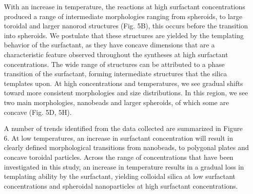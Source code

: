\documentclass[a4paper,12pt,twocolumn]{article}
\begin{document}
  	\begin{figure}[h!]
  	\noindent%
	\begin{minipage}{\linewidth}%
	\end{minipage}
	\end{figure}	
  	
  	
  	With an increase in temperature, the reactions at high surfactant concentrations produced a range of intermediate morphologies ranging from spheroids, to large toroidal and larger nanorod structures (Fig. 5B), this occurs before the transition into spheroids. We postulate that these structures are yielded by the templating behavior of the surfactant, as they have concave dimensions that are a characteristic feature observed throughout the syntheses at high surfactant concentrations. The wide range of structures can be attributed to a phase transition of the surfactant, forming intermediate structures that the silica templates upon. At high concentrations and temperatures, we see gradual shifts toward more consistent morphologies and size distributions. In this region, we see two main morphologies, nanobeads and larger spheroids, of which some are concave (Fig. 5D, 5H).
  	
  	A number of trends identified from the data collected are summarized in Figure 6. At low temperatures, an increase in surfactant concentration will result in clearly defined morphological transitions from nanobeads, to polygonal plates and concave toroidal particles. Across the range of concentrations that have been investigated in this study, an increase in temperature results in a gradual loss in templating ability by the surfactant, yielding colloidal silica at low surfactant concentrations and spheroidal nanoparticles at high surfactant concentrations.
	 
\end{document}
